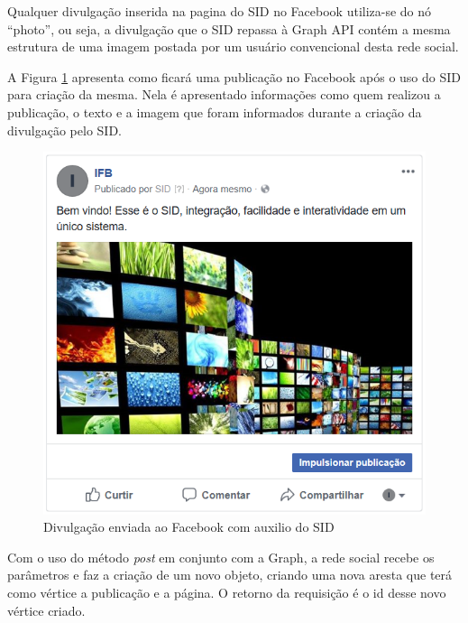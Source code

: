 Qualquer divulgação inserida na pagina do SID no Facebook utiliza-se do nó “photo”, ou seja, a divulgação que o SID repassa à Graph API contém a mesma estrutura de uma imagem postada por um usuário convencional desta rede social.

A Figura \ref{fig:imgfacebook1} apresenta como ficará uma publicação no Facebook após o uso do SID para criação da mesma. Nela é apresentado informações como quem realizou a publicação, o texto e a imagem que foram informados durante a criação da divulgação pelo SID.

\begin{figure}[H]
\centering
\includegraphics[scale=1]{figuras/imgfacebook1}
\caption{Divulgação enviada ao Facebook com auxilio do SID}
\label{fig:imgfacebook1}
\end{figure}

Com o uso do método \textit{post} em conjunto com a Graph, a rede social recebe os parâmetros e faz a criação de um novo objeto, criando uma nova aresta que terá como vértice a publicação e a página. O retorno da requisição é o id desse novo vértice criado. 





